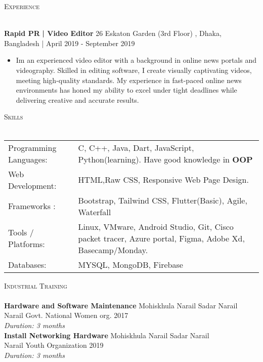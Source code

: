 \documentclass[a4paper]{article}
\newcommand{\lineunder} {
    \vspace*{-8pt} \\
    \hspace*{-18pt} \hrulefill \\
}
\newcommand{\header} [1] {
    {\hspace*{-18pt}\vspace*{9pt} \textsc{#1}}
    \vspace*{-9pt} \lineunder
}
\begin{document}
      \header{Experience}
      \vspace{2mm}

      \textbf{Rapid PR}\textbf{ | Video Editor} \hfill 26 Eskaton Garden (3rd Floor) , Dhaka, Bangladesh | April 2019 - September 2019\\
          \vspace{-3mm}
\begin{itemize} \itemsep -3pt
\item[] I\textquotesingle{}m an experienced video editor with a background in online news portals and videography. Skilled in editing software, I create visually captivating videos, meeting high-quality standards. My experience in fast-paced online news environments has honed my ability to excel under tight deadlines while delivering creative and accurate results.
\end{itemize}
\vspace{3mm}
%
%
  \header{Skills}
  \vspace{2mm}
  \begin{longtable}{p{4cm}p{12cm}}
  Programming Languages: & C, C++, Java, Dart, JavaScript, Python(learning). Have good knowledge in \textbf{OOP} \\
  Web Development: & HTML,Raw CSS, Responsive Web Page Design. \\
 Frameworks : & Bootstrap, Tailwind CSS, Flutter(Basic), Agile, Waterfall\\
  Tools / Platforms: & Linux, VMware, Android Studio, Git, Cisco packet tracer, Azure portal, Figma, Adobe Xd, Basecamp/Monday. \\
  Databases: & MYSQL, MongoDB, Firebase \\
  \end{longtable}
\vspace{3mm}


      \header{Industrial Training}
      \vspace{2mm}
      \textbf{Hardware and Software Maintenance
 }\hfill Mohiskhula  Narail Sadar Narail\\
Narail Govt. National Women org. \hfill 2017
\\
{\sl Duration: 3 months}\\
\vspace{2mm}
      \textbf{Install Networking Hardware
}\hfill Mohiskhula  Narail Sadar Narail \\
Narail Youth Organization \hfill 2019\\
{\sl Duration: 3 months}\\
\vspace{4mm}
\end{document}
